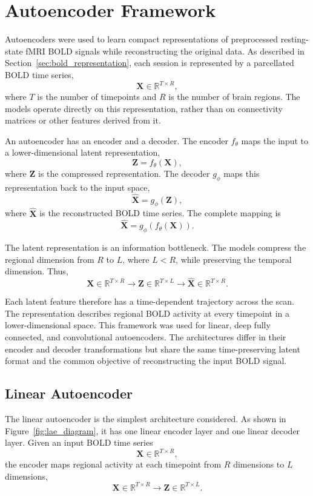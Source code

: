 \section{Autoencoder Framework}

Autoencoders were used to learn compact representations of preprocessed
resting-state fMRI BOLD signals while reconstructing the original data.
As described in Section~\ref{sec:bold_representation}, each session is
represented by a parcellated BOLD time series,
\[
\mathbf{X} \in \mathbb{R}^{T \times R},
\]
where $T$ is the number of timepoints and $R$ is the number of brain
regions. The models operate directly on this representation, rather than
on connectivity matrices or other features derived from it.

An autoencoder has an encoder and a decoder. The encoder $f_{\theta}$
maps the input to a lower-dimensional latent representation,
\[
\mathbf{Z} = f_{\theta}(\mathbf{X}),
\]
where $\mathbf{Z}$ is the compressed representation. The decoder
$g_{\phi}$ maps this representation back to the input space,
\[
\hat{\mathbf{X}} = g_{\phi}(\mathbf{Z}),
\]
where $\hat{\mathbf{X}}$ is the reconstructed BOLD time series. The
complete mapping is
\[
\hat{\mathbf{X}} = g_{\phi}\left(f_{\theta}(\mathbf{X})\right).
\]

The latent representation is an information bottleneck. The models
compress the regional dimension from $R$ to $L$, where $L<R$, while
preserving the temporal dimension. Thus,
\[
\mathbf{X} \in \mathbb{R}^{T \times R}
\longrightarrow
\mathbf{Z} \in \mathbb{R}^{T \times L}
\longrightarrow
\hat{\mathbf{X}} \in \mathbb{R}^{T \times R}.
\]

Each latent feature therefore has a time-dependent trajectory across the scan. The representation describes regional BOLD activity at every timepoint in a lower-dimensional space.
This framework was used for linear, deep fully connected, and convolutional autoencoders. The architectures differ in their encoder and decoder transformations but share the same time-preserving latent format and the common objective of reconstructing the input BOLD signal.

\subsection{Linear Autoencoder}

The linear autoencoder is the simplest architecture considered. As shown
in Figure~\ref{fig:lae_diagram}, it has one linear encoder layer and one
linear decoder layer. Given an input BOLD time series
\[
\mathbf{X}\in\mathbb{R}^{T\times R},
\]
the encoder maps regional activity at each timepoint from $R$ dimensions
to $L$ dimensions,
\[
\mathbf{X}\in\mathbb{R}^{T\times R}
\longrightarrow
\mathbf{Z}\in\mathbb{R}^{T\times L}.
\]

